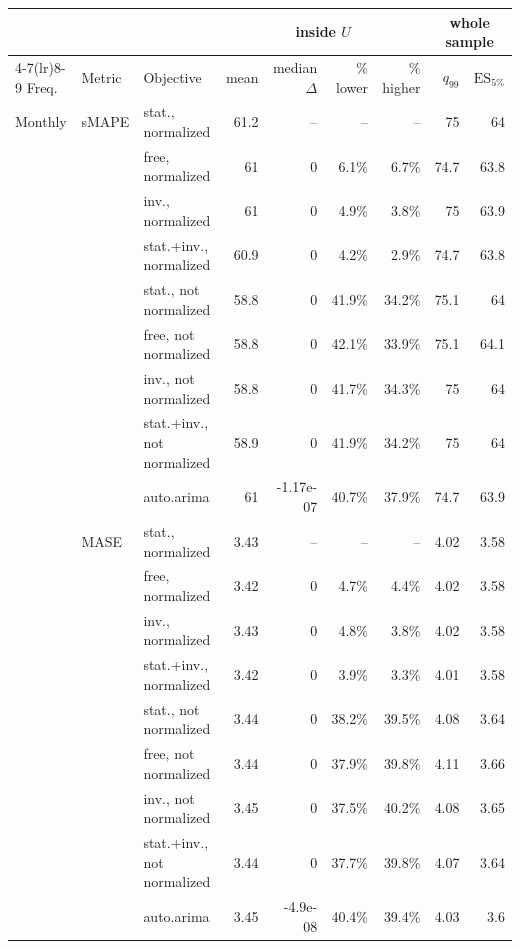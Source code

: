 \begin{tabular}{lllrrrrrr}
\toprule
 & & & \multicolumn{4}{c}{inside $U$} & \multicolumn{2}{c}{whole sample} \\
\cmidrule(lr){4-7}\cmidrule(lr){8-9}
Freq. & Metric & Objective & mean & median $\Delta$ & \% lower & \% higher & $q_{99}$ & $\mathrm{ES}_{5\%}$ \\
\midrule
Monthly & sMAPE & stat., normalized & 61.2 & -- & -- & -- & 75 & 64 \\
 &  & free, normalized & 61 & 0 & 6.1\% & 6.7\% & 74.7 & 63.8 \\
 &  & inv., normalized & 61 & 0 & 4.9\% & 3.8\% & 75 & 63.9 \\
 &  & stat.+inv., normalized & 60.9 & 0 & 4.2\% & 2.9\% & 74.7 & 63.8 \\
 &  & stat., not normalized & 58.8 & 0 & 41.9\% & 34.2\% & 75.1 & 64 \\
 &  & free, not normalized & 58.8 & 0 & 42.1\% & 33.9\% & 75.1 & 64.1 \\
 &  & inv., not normalized & 58.8 & 0 & 41.7\% & 34.3\% & 75 & 64 \\
 &  & stat.+inv., not normalized & 58.9 & 0 & 41.9\% & 34.2\% & 75 & 64 \\
 &  & auto.arima & 61 & -1.17e-07 & 40.7\% & 37.9\% & 74.7 & 63.9 \\
 & MASE & stat., normalized & 3.43 & -- & -- & -- & 4.02 & 3.58 \\
 &  & free, normalized & 3.42 & 0 & 4.7\% & 4.4\% & 4.02 & 3.58 \\
 &  & inv., normalized & 3.43 & 0 & 4.8\% & 3.8\% & 4.02 & 3.58 \\
 &  & stat.+inv., normalized & 3.42 & 0 & 3.9\% & 3.3\% & 4.01 & 3.58 \\
 &  & stat., not normalized & 3.44 & 0 & 38.2\% & 39.5\% & 4.08 & 3.64 \\
 &  & free, not normalized & 3.44 & 0 & 37.9\% & 39.8\% & 4.11 & 3.66 \\
 &  & inv., not normalized & 3.45 & 0 & 37.5\% & 40.2\% & 4.08 & 3.65 \\
 &  & stat.+inv., not normalized & 3.44 & 0 & 37.7\% & 39.8\% & 4.07 & 3.64 \\
 &  & auto.arima & 3.45 & -4.9e-08 & 40.4\% & 39.4\% & 4.03 & 3.6 \\
\bottomrule
\end{tabular}
